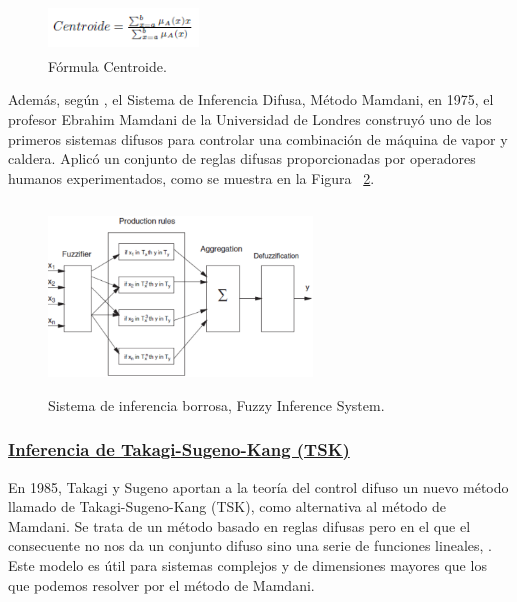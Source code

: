 \documentclass[10pt,conference]{IEEEtran}
\begin{document}
\begin{enumerate}
    \begin{figure}[H]
    \begin{center}
    \includegraphics[width=4cm,height=1.3cm]{figuras/ec1.PNG}
    \caption{Fórmula Centroide.}
    \label{C2} 
    \end{center}
    \end{figure}

    Además, según \citep{FuzzyLog14}, el Sistema de Inferencia Difusa, Método Mamdani, en 1975, el profesor Ebrahim Mamdani de la Universidad de Londres construyó uno de los primeros sistemas difusos para controlar una combinación de máquina de vapor y caldera. Aplicó un conjunto de reglas difusas proporcionadas por operadores humanos experimentados, como se muestra en la Figura ~\ref{C3}.
    
    \begin{figure}[H]
    \begin{center}
    \includegraphics[width=7cm,height=5cm]{figuras/ec2.PNG}
    \caption{Sistema de inferencia borrosa, Fuzzy Inference System.}
    \label{C3} 
    \end{center}
    \end{figure}
\end{enumerate}

\subsubsection{\textbf{\underline{Inferencia de Takagi-Sugeno-Kang (TSK)}}}
En 1985, Takagi y Sugeno aportan a la teoría del control difuso un nuevo método llamado de Takagi-Sugeno-Kang (TSK), como alternativa al método de Mamdani. Se trata de un método basado en reglas difusas pero en el que el consecuente no nos da un conjunto difuso sino una serie de funciones lineales, \citep{diciembre2017sistemas}. Este modelo es útil para sistemas complejos y de dimensiones mayores que los que podemos resolver por el método de Mamdani.
\end{document}
